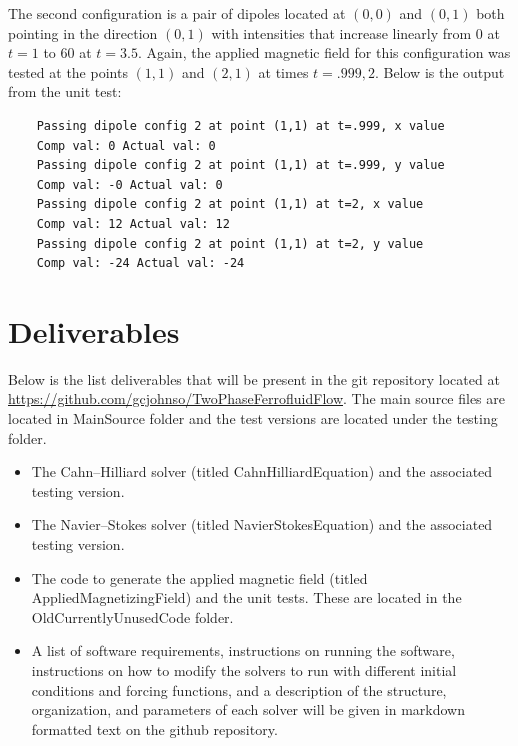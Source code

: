 \documentclass[11pt,fullpage]{article}
\theoremstyle{lemma}
\theoremstyle{definition}
\theoremstyle{lemma}
\begin{document}
The second configuration is a pair of dipoles located at $(0,0)$ and $(0,1)$ both pointing in the direction $(0,1)$ with intensities that increase linearly from $0$ at $t=1$ to $60$ at $t=3.5$. Again, the applied magnetic field for this configuration was tested at the points $(1,1)$ and $(2,1)$ at times $t=.999,2$. Below is the output from the unit test:
\begin{verbatim}
	Passing dipole config 2 at point (1,1) at t=.999, x value
	Comp val: 0 Actual val: 0
	Passing dipole config 2 at point (1,1) at t=.999, y value
	Comp val: -0 Actual val: 0
	Passing dipole config 2 at point (1,1) at t=2, x value
	Comp val: 12 Actual val: 12
	Passing dipole config 2 at point (1,1) at t=2, y value
	Comp val: -24 Actual val: -24
\end{verbatim}

\section{Deliverables}
Below is the list deliverables that will be present in the git repository located at \url{https://github.com/gcjohnso/TwoPhaseFerrofluidFlow}. The main source files are located in MainSource folder and the test versions are located under the testing folder.
\begin{itemize}
	\item The Cahn--Hilliard solver (titled CahnHilliardEquation) and the associated testing version.
	
	\item The Navier--Stokes solver (titled NavierStokesEquation) and the associated testing version.
	
	\item The code to generate the applied magnetic field (titled AppliedMagnetizingField) and the unit tests. These are located in the OldCurrentlyUnusedCode folder.
	
	\item A list of software requirements, instructions on running the software, instructions on how to modify the solvers to run with different initial conditions and forcing functions, and a description of the structure, organization, and parameters of each solver will be given in markdown formatted text on the github repository.
\end{itemize}
\end{document}
